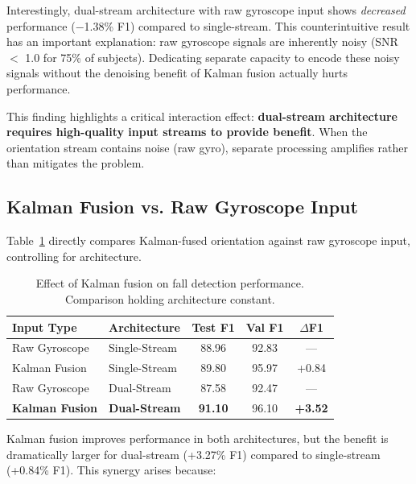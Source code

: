 Interestingly, dual-stream architecture with raw gyroscope input shows \textit{decreased} performance ($-$1.38\% F1) compared to single-stream. This counterintuitive result has an important explanation: raw gyroscope signals are inherently noisy (SNR $<$ 1.0 for 75\% of subjects). Dedicating separate capacity to encode these noisy signals without the denoising benefit of Kalman fusion actually hurts performance.

This finding highlights a critical interaction effect: \textbf{dual-stream architecture requires high-quality input streams to provide benefit}. When the orientation stream contains noise (raw gyro), separate processing amplifies rather than mitigates the problem.

\subsection{Kalman Fusion vs. Raw Gyroscope Input}
\label{subsec:kalman_vs_raw}

Table~\ref{tab:kalman_vs_raw} directly compares Kalman-fused orientation against raw gyroscope input, controlling for architecture.

\begin{table}[H]
\caption{Effect of Kalman fusion on fall detection performance. Comparison holding architecture constant.}
\label{tab:kalman_vs_raw}
\centering
\begin{tabular}{llccc}
\toprule
\textbf{Input Type} & \textbf{Architecture} & \textbf{Test F1} & \textbf{Val F1} & \textbf{$\Delta$F1} \\
\midrule
Raw Gyroscope & Single-Stream & 88.96 & 92.83 & --- \\
Kalman Fusion & Single-Stream & 89.80 & 95.97 & +0.84 \\
\midrule
Raw Gyroscope & Dual-Stream & 87.58 & 92.47 & --- \\
\textbf{Kalman Fusion} & \textbf{Dual-Stream} & \textbf{91.10} & 96.10 & \textbf{+3.52} \\
\bottomrule
\end{tabular}
\end{table}

Kalman fusion improves performance in both architectures, but the benefit is dramatically larger for dual-stream (+3.27\% F1) compared to single-stream (+0.84\% F1). This synergy arises because:

